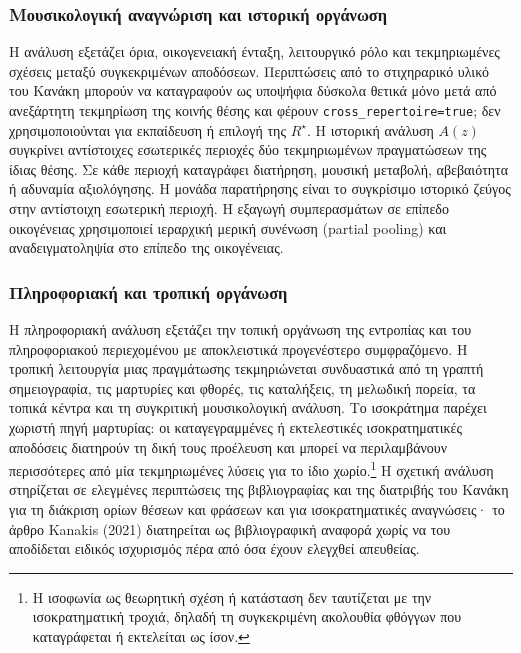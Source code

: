 \documentclass[11pt,a4paper]{article}
\begin{document}
\subsubsection{Μουσικολογική αναγνώριση και ιστορική οργάνωση}
Η ανάλυση εξετάζει όρια, οικογενειακή ένταξη, λειτουργικό ρόλο και τεκμηριωμένες σχέσεις μεταξύ συγκεκριμένων αποδόσεων. Περιπτώσεις από το στιχηραρικό υλικό του Κανάκη μπορούν να καταγραφούν ως υποψήφια δύσκολα θετικά μόνο μετά από ανεξάρτητη τεκμηρίωση της κοινής θέσης και φέρουν \texttt{cross\_repertoire=true}; δεν χρησιμοποιούνται για εκπαίδευση ή επιλογή της $R^\star$. Η ιστορική ανάλυση $A(z)$ συγκρίνει αντίστοιχες εσωτερικές περιοχές δύο τεκμηριωμένων πραγματώσεων της ίδιας θέσης. Σε κάθε περιοχή καταγράφει διατήρηση, μουσική μεταβολή, αβεβαιότητα ή αδυναμία αξιολόγησης. Η μονάδα παρατήρησης είναι το συγκρίσιμο ιστορικό ζεύγος στην αντίστοιχη εσωτερική περιοχή. Η εξαγωγή συμπερασμάτων σε επίπεδο οικογένειας χρησιμοποιεί ιεραρχική μερική συνένωση (partial pooling) και αναδειγματοληψία στο επίπεδο της οικογένειας.

\subsubsection{Πληροφοριακή και τροπική οργάνωση}
Η πληροφοριακή ανάλυση εξετάζει την τοπική οργάνωση της εντροπίας και του πληροφοριακού περιεχομένου με αποκλειστικά προγενέστερο συμφραζόμενο. Η τροπική λειτουργία μιας πραγμάτωσης τεκμηριώνεται συνδυαστικά από τη γραπτή σημειογραφία, τις μαρτυρίες και φθορές, τις καταλήξεις, τη μελωδική πορεία, τα τοπικά κέντρα και τη συγκριτική μουσικολογική ανάλυση. Το ισοκράτημα παρέχει χωριστή πηγή μαρτυρίας: οι καταγεγραμμένες ή εκτελεστικές ισοκρατηματικές αποδόσεις διατηρούν τη δική τους προέλευση και μπορεί να περιλαμβάνουν περισσότερες από μία τεκμηριωμένες λύσεις για το ίδιο χωρίο.\footnote{Η ισοφωνία ως θεωρητική σχέση ή κατάσταση δεν ταυτίζεται με την ισοκρατηματική τροχιά, δηλαδή τη συγκεκριμένη ακολουθία φθόγγων που καταγράφεται ή εκτελείται ως ίσον.} Η σχετική ανάλυση στηρίζεται σε ελεγμένες περιπτώσεις της βιβλιογραφίας και της διατριβής του Κανάκη για τη διάκριση ορίων θέσεων και φράσεων και για ισοκρατηματικές αναγνώσεις· το άρθρο Kanakis (2021) διατηρείται ως βιβλιογραφική αναφορά χωρίς να του αποδίδεται ειδικός ισχυρισμός πέρα από όσα έχουν ελεγχθεί απευθείας.
\end{document}
